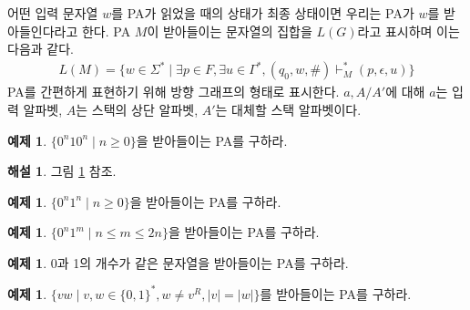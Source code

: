\documentclass[b5paper, 11pt]{book}
\theoremstyle{definition}
\newtheorem{ex}[defn]{예제}
\newtheorem*{ans*}{해설}
\begin{document}
어떤 입력 문자열 $w$를 PA가 읽었을 때의 상태가 최종 상태이면 우리는 PA가 $w$를 받아들인다라고 한다. PA $M$이 받아들이는 문자열의 집합을 $L(G)$라고 표시하며 이는 다음과 같다.
\begin{align*}
    L(M) = \{w \in \Sigma^* \;\vert\; \exists p\in F, \exists u \in \Gamma^* , (q_0, w, \text{\#}) \vdash_M^* (p, \epsilon, u)\}
\end{align*}
PA를 간편하게 표현하기 위해 방향 그래프의 형태로 표시한다. $a, A/A'$에 대해 $a$는 입력 알파벳, $A$는 스택의 상단 알파벳, $A'$는 대체할 스택 알파벳이다. 
\begin{ex}\label{0n10n_ex}
    $\{0^n10^{n} \;\vert\; n \ge 0 \}$을 받아들이는 PA를 구하라. 
\end{ex}
\begin{ans*}
    그림 \ref{0n10n} 참조.
\end{ans*}
\begin{figure}[!ht]
    \centering
    \caption{} 
    \label{0n10n}
\end{figure}
\begin{ex}
    $\{0^n1^{n} \;\vert\; n \ge 0 \}$을 받아들이는 PA를 구하라.
\end{ex}
\begin{ex}
    $\{0^n1^{m} \;\vert\; n \le m \le 2n \}$을 받아들이는 PA를 구하라.
\end{ex}
\begin{ex}
    0과 1의 개수가 같은 문자열을 받아들이는 PA를 구하라. 
\end{ex}
\begin{ex}
    $\{ vw \;\vert\; v,w \in \{0,1\}^*, w \neq v^R , \vert v \vert = \vert w \vert \}$를 
    받아들이는 PA를 구하라.
\end{ex}
\end{document}

